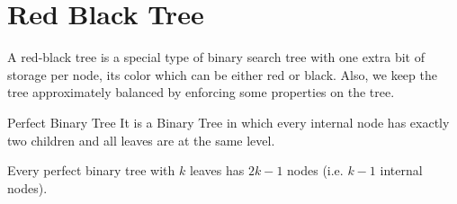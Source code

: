 \chapter{Red Black Tree}
A red-black tree is a special type of binary search tree with one extra bit of storage per node, its color which can be either red or black. Also, we keep the tree approximately balanced by enforcing some properties on the tree.
\begin{definition}{Perfect Binary Tree}{}
	It is a Binary Tree in which every internal node has exactly two children and all leaves are at the same level.
\end{definition}
\begin{Lemma}{}{}
	Every perfect binary tree with $k$ leaves has $2k-1$  nodes (i.e. $k-1$ internal nodes).
\end{Lemma}
